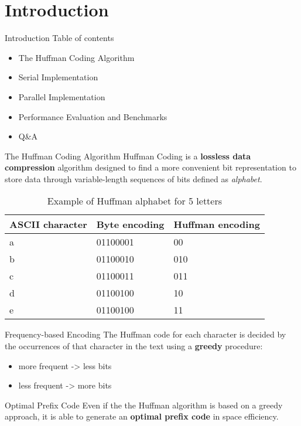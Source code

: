 \section{Introduction}

\begin{frame}{Introduction}
    Table of contents
    \begin{itemize}
        \item The Huffman Coding Algorithm
        \item Serial Implementation
        \item Parallel Implementation
        \item Performance Evaluation and Benchmarks
        \item Q\&A
    \end{itemize}
\end{frame}

\begin{frame}{The Huffman Coding Algorithm}
    Huffman Coding is a \textbf{lossless data compression} algorithm  designed to find a more convenient bit representation to store data through variable-length sequences of bits defined as \emph{alphabet}.
    \begin{table}[]
        \centering
        \begin{tabular}{lll}
            \toprule
            ASCII character & Byte encoding & Huffman encoding \\
            \midrule
             a &  01100001 & 00 \\
             b &  01100010 & 010 \\
             c &  01100011 & 011 \\
             d &  01100100 & 10 \\
             e &  01100100 & 11 \\
             \bottomrule
        \end{tabular}
        \caption{Example of Huffman alphabet for 5 letters}
        \label{tab:my_label}
    \end{table}
\end{frame}

\begin{frame}{Frequency-based Encoding}
    The Huffman code for each character is decided by the occurrences of that character in the text using a \textbf{greedy} procedure:
    \begin{itemize}
        \item more frequent -> less bits
        \item less frequent -> more bits
    \end{itemize}
\end{frame}

\begin{frame}{Optimal Prefix Code}
    Even if the the Huffman algorithm is based on a greedy approach, it is able to generate an \textbf{optimal prefix code} in space efficiency.
\end{frame}

